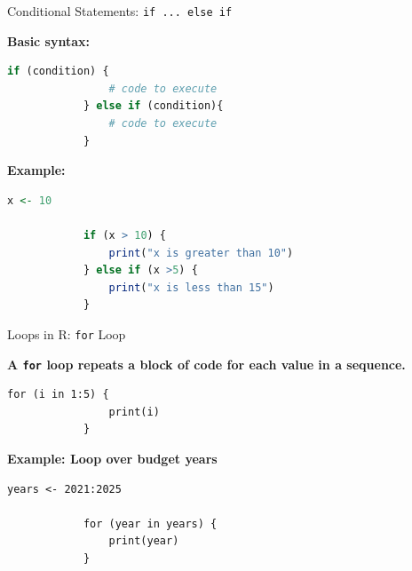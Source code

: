 \documentclass[aspectratio=169,11pt]{beamer}
\begin{document}
	\begin{frame}[fragile]{Conditional Statements: \texttt{if ... else if}}
		
		\vspace{0.3cm}
		
		\textbf{Basic syntax:}
		
		\begin{lstlisting}[language=R]
			if (condition) {
				# code to execute
			} else if (condition){
				# code to execute
			}
		\end{lstlisting}
		
		\vspace{0.2cm}
		
		\textbf{Example:}
		
		\begin{lstlisting}[language=R]
			x <- 10
			
			if (x > 10) {
				print("x is greater than 10")
			} else if (x >5) {
				print("x is less than 15")
			}
		\end{lstlisting}
		
	\end{frame}
	
	\begin{frame}[fragile]{Loops in R: \texttt{for} Loop}
		
		\textbf{A \texttt{for} loop repeats a block of code for each value in a sequence.}
		
		\vspace{0.3cm}
		
		\begin{lstlisting}[basicstyle=\small\ttfamily]
			for (i in 1:5) {
				print(i)
			}
		\end{lstlisting}
		
		\vspace{0.2cm}
		
		\textbf{Example: Loop over budget years}
		
		\begin{lstlisting}[basicstyle=\small\ttfamily]
			years <- 2021:2025
			
			for (year in years) {
				print(year)
			}
		\end{lstlisting}
		
	\end{frame}
	
\end{document}
